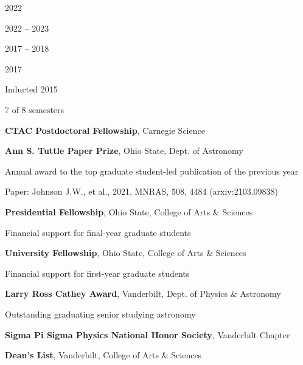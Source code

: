 \documentclass[cv.tex]{subfiles}
\begin{document}
\parbox{0.18\textwidth}{%
	 \par
	2022 \par
	\null \par
	\null \par
	2022 -- 2023 \par
	\null \par
	2017 -- 2018 \par
	\null \par
	2017 \par
	\null \par
	Inducted 2015 \par
	7 of 8 semesters
}
\hspace{1mm}
\parbox{0.8\textwidth}{%
	\vspace{1mm}
	\textbf{CTAC Postdoctoral Fellowship}, Carnegie Science \par
	\textbf{Ann S. Tuttle Paper Prize}, Ohio State, Dept. of Astronomy \par
	Annual award to the top graduate student-led publication of the previous
	year \par
	Paper: Johnson J.W., et al., 2021, MNRAS, 508, 4484 (arxiv:2103.09838) \par
	\textbf{Presidential Fellowship}, Ohio State, College of Arts \& Sciences
	\par
	Financial support for final-year graduate students \par
	\textbf{University Fellowship}, Ohio State, College of Arts \& Sciences \par
	Financial support for first-year graduate students \par
	\textbf{Larry Ross Cathey Award}, Vanderbilt, Dept. of Physics \& Astronomy
	\par
	Outstanding graduating senior studying astronomy \par
	\textbf{Sigma Pi Sigma Physics National Honor Society}, Vanderbilt Chapter
	\par
	\textbf{Dean's List}, Vanderbilt, College of Arts \& Sciences
}
\end{document}
